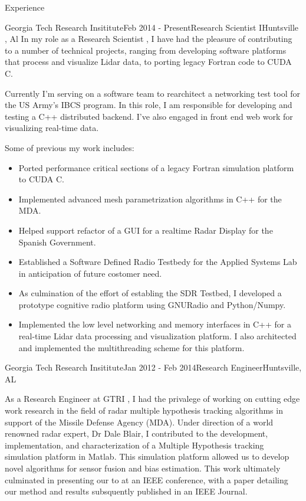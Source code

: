 \documentclass{resume} %
\begin{document}

\begin{rSection}{Experience}

\begin{rSubsection}{Georgia Tech Research Insititute}{Feb 2014 - Present}{Research Scientist I}{Huntsville , Al}
In my role as a Research Scientist , I have had the pleasure of contributing to a number of technical projects, ranging from
developing software platforms that process and visualize Lidar data, to porting legacy Fortran code to CUDA C. 

Currently I'm serving on a software team to rearchitect a networking test tool for the US Army's IBCS program. In this role, I
am responsible for developing and  testing a C++ distributed backend. I've also engaged in front end web work for visualizing
real-time data.

Some of previous my work includes:
\begin{itemize}
 \item Ported  performance critical sections of a legacy Fortran  simulation platform to CUDA C.
\item Implemented advanced mesh parametrization algorithms in C++ for the MDA.
\item Helped support refactor of a GUI for a realtime Radar Display for the Spanish Government.
\item Established a Software Defined Radio Testbedy for the Applied Systems Lab in anticipation of future costomer need.
\item As culmination of the effort of establing the SDR Testbed, I developed a prototype cognitive radio  platform using GNURadio and Python/Numpy.
\item Implemented the low level networking and memory interfaces in C++ for a real-time Lidar data processing and visualization platform. I also architected and implemented the multithreading scheme for this platform.
\end{itemize}
\end{rSubsection}

\begin{rSubsection}{Georgia Tech Research Insititute}{Jan  2012 - Feb 2014}{Research Engineer}{Huntsville, AL}
\item
As a Research Engineer at GTRI , I had the privalege of working on cutting edge work research in the field of
radar multiple hypothesis tracking  algorithms in support of the Missile Defense Agency (MDA). Under direction of a world 
renowned radar expert, Dr Dale Blair, I contributed to the development, implementation, and characterization of a Multiple Hypothesis
tracking simulation platform in Matlab. This simulation platform allowed us to develop novel algorithms for sensor fusion and bias estimation.
This work ultimately culminated in presenting our to at an IEEE conference, with a paper detailing our method and results subsquently published
 in an IEEE Journal.
\end{rSubsection}


\end{rSection}
\end{document}
